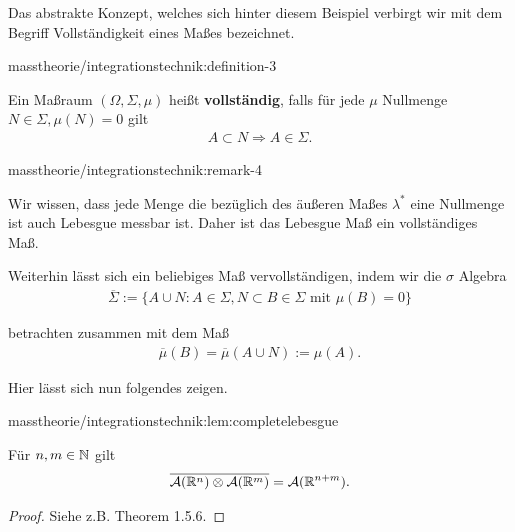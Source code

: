 \par
Das abstrakte Konzept, welches sich hinter diesem Beispiel verbirgt wir mit dem Begriff Vollständigkeit eines Maßes bezeichnet.
\begin{definition}{}{masstheorie/integrationstechnik:definition-3}



\par
Ein Maßraum \((\Omega,\Sigma,\mu)\) heißt \textbf{vollständig}, falls für jede \(\mu\) Nullmenge \(N\in\Sigma, \mu(N)=0\) gilt
\begin{align*}
A\subset N \Rightarrow A\in \Sigma.
\end{align*}\end{definition}
\begin{remark}{}{masstheorie/integrationstechnik:remark-4}



\par
Wir wissen, dass jede Menge die bezüglich des äußeren Maßes \(\lambda^\ast\) eine Nullmenge ist auch Lebesgue messbar ist. Daher ist das Lebesgue Maß ein vollständiges Maß.
\end{remark}

\par
Weiterhin lässt sich ein beliebiges Maß vervollständigen, indem wir die \(\sigma\) Algebra
\begin{align*}
\overline{\Sigma}:=\{A\cup N: A\in\Sigma, N\subset B\in\Sigma\text{ mit }\mu(B)=0\}
\end{align*}
\par
betrachten zusammen mit dem Maß
\begin{align*}
\overline{\mu}(B)= \overline{\mu}(A\cup N):= \mu(A).
\end{align*}
\par
Hier lässt sich nun folgendes zeigen.
\begin{lemma}{}{masstheorie/integrationstechnik:lem:completelebesgue}



\par
Für \(n,m\in\mathbb{N}\) gilt
\begin{align*}
\overline{\mathcal{A}(\mathbb{R}^n)\otimes\mathcal{A}(\mathbb{R}^m)}= \mathcal{A}(\mathbb{R}^{n+m}).
\end{align*}\end{lemma}

\begin{proof}
 Siehe z.B. \cite{Bog07} Theorem 1.5.6.
\end{proof}


